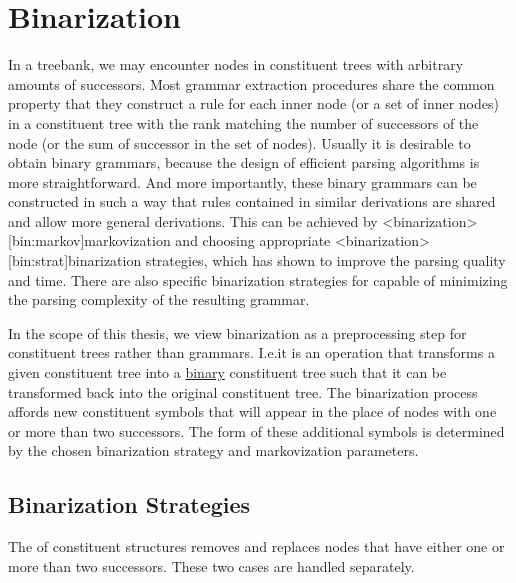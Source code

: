 \documentclass[../../document.tex]{subfiles}
\begin{document}
    \section{Binarization} 
    In a treebank, we may encounter nodes in constituent trees with arbitrary amounts of successors.
    Most grammar extraction procedures share the common property that they construct a rule for each inner node (or a set of inner nodes) in a constituent tree with the rank matching the number of successors of the node (or the sum of successor in the set of nodes).
    Usually it is desirable to obtain binary grammars, because the design of efficient parsing algorithms is more straightforward.
    And more importantly, these binary grammars can be constructed in such a way that rules contained in similar derivations are shared and allow more general derivations.
    This can be achieved by <binarization>[bin:markov]{markovization} and choosing appropriate <binarization>[bin:strat]{binarization strategies}, which has shown to improve the parsing quality and time. \citep{Son08,Cra12}
    There are also specific binarization strategies for  capable of minimizing the parsing complexity of the resulting grammar. \citep{Gil10}

    In the scope of this thesis, we view binarization as a preprocessing step for constituent trees rather than grammars.
    I.e.\@ it is an operation that transforms a given constituent tree into a \hyperlink{binctree}{binary} constituent tree such that it can be transformed back into the original constituent tree.
    The binarization process affords new constituent symbols that will appear in the place of nodes with one or more than two successors.
    The form of these additional symbols is determined by the chosen binarization strategy and markovization parameters.

    \subsection{Binarization Strategies}
    The  of constituent structures removes and replaces nodes that have either one or more than two successors.
    These two cases are handled separately.
\end{document}
